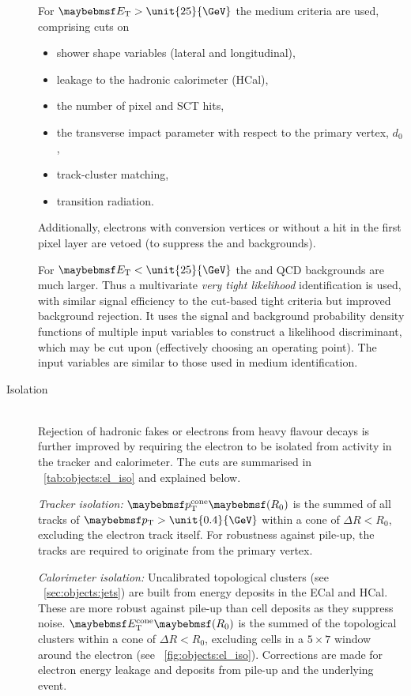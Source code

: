 \begin{description}
	For $\et > \unit{25}{\GeV}$ the medium criteria are used, comprising cuts on
	\begin{itemize}[noitemsep,nolistsep]
		\item shower shape variables (lateral and longitudinal),
		\item leakage to the hadronic calorimeter (HCal),
		\item the number of pixel and SCT hits,
		\item the transverse impact parameter with respect to the primary vertex, $d_0$,
		\item track-cluster matching,
		\item transition radiation.
	\end{itemize}
	Additionally, electrons with conversion vertices or without a hit in the first 
	pixel layer are vetoed (to suppress the \Wgamma and \Wjets backgrounds).
 
 	For $\et < \unit{25}{\GeV}$ the \Wjets and QCD backgrounds are much larger. Thus a 
 	multivariate \textit{very tight likelihood} identification is used, with similar 
 	signal efficiency to the cut-based tight criteria but improved background rejection. 
 	It uses the signal and background probability density functions of multiple input 
 	variables to construct a likelihood discriminant, which may be cut upon (effectively 
 	choosing an operating point). The input variables are similar to those used in 
 	medium identification.

\item[Isolation] \hfill \\
	Rejection of hadronic fakes or electrons from heavy flavour decays is further 
	improved by requiring the electron to be isolated from activity in the tracker and 
	calorimeter. The cuts are summarised in \Table~\ref{tab:objects:el_iso} and explained 
	below.

	\textit{Tracker isolation:} $\ptcone{R_0}$ is the summed \pt of all tracks of 
	$\pt > \unit{0.4}{\GeV}$ within a cone of $\Delta R < R_0$, excluding the electron 
	track itself. For robustness against pile-up, the tracks are required to originate 
	from the primary vertex.

	\textit{Calorimeter isolation:} Uncalibrated topological clusters (see 
	\Section~\ref{sec:objects:jets}) are built from energy deposits in the ECal 
	and HCal. These are more robust against pile-up than cell deposits as they 
	suppress noise. $\etcone{R_0}$ is the summed \et of the topological clusters within a 
	cone of $\Delta R < R_0$, excluding cells in a $5 \times 7$ window around the 
	electron (see \Figure~\ref{fig:objects:el_iso}). Corrections are made for electron 
	energy leakage and deposits from pile-up and the underlying event.


\end{description}
